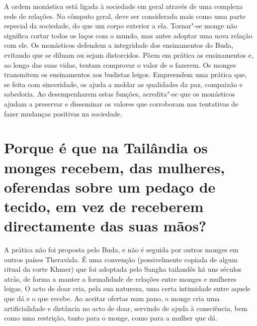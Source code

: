 A ordem monástica está ligada à sociedade em geral através de uma
complexa rede de relações. No cômputo geral, deve ser considerada mais
como uma parte especial da sociedade, do que um corpo exterior a ela.
Tornar"-se monge não significa cortar todos os laços com o mundo, mas
antes adoptar uma nova relação com ele. Os monásticos defendem a
integridade dos ensinamentos do Buda, evitando que se diluam ou sejam
distorcidos. Põem em prática os ensinamentos e, ao longo das suas vidas,
tentam comprovar o valor de o fazerem. Os monges transmitem os
ensinamentos aos budistas leigos. Empreendem uma prática que, se feita
com sinceridade, os ajuda a moldar as qualidades da paz, compaixão e
sabedoria. Ao desempenharem estas funções, acredita"-se que os monásticos
ajudam a preservar e disseminar os valores que corroboram nas tentativas
de fazer mudanças positivas na sociedade.

\section{Porque é que na Tailândia os monges recebem, das mulheres, oferendas
  sobre um pedaço de tecido, em vez de receberem directamente das suas mãos?}

A prática não foi proposta pelo Buda, e não é seguida por outros monges
em outros países Theravāda. É uma convenção (possivelmente copiada de
algum ritual da corte Khmer) que foi adoptada pelo Sangha tailandês há
uns séculos atrás, de forma a manter a formalidade de relações entre
monges e mulheres leigas. O acto de doar cria, pela sua natureza, uma
certa intimidade entre aquele que dá e o que recebe. Ao aceitar ofertas
num pano, o monge cria uma artificialidade e distância no acto de doar,
servindo de ajuda à consciência, bem como uma restrição, tanto para o
monge, como para a mulher que dá.

